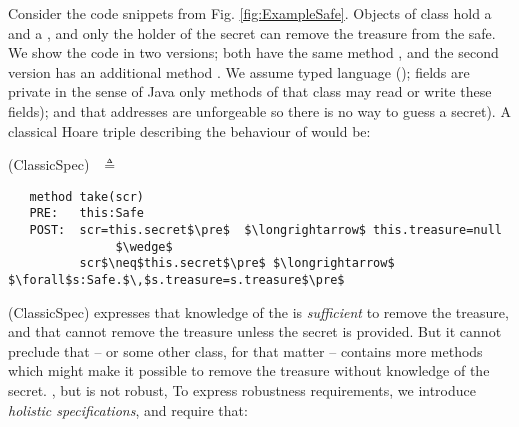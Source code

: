 Consider the code snippets from Fig. \ref{fig:ExampleSafe}. Objects of
 class   hold a  and a , and  only
 the holder of the secret can remove the treasure from the safe.
%
 We show the code in two versions; both   have the same method , and the second version 
 has an additional method .
  We 
 assume  typed language (); 
 fields are private in the sense of Java \sophia{(}\ie only
 methods of that class may read or write these fields);
 and that addresses are unforgeable \sophia{(}so  there is no way to guess a secret). 
 A classical Hoare triple describing the behaviour of  would be:
 
  \vspace{.1in}
  
(ClassicSpec)$  \ \ $  $\triangleq$
\vspace{-.1in}
\begin{lstlisting}
   method take(scr)
   PRE:   this:Safe  
   POST:  scr=this.secret$\pre$  $\longrightarrow$ this.treasure=null 
               $\wedge$
          scr$\neq$this.secret$\pre$ $\longrightarrow$  $\forall$s:Safe.$\,$s.treasure=s.treasure$\pre$
 \end{lstlisting}
\vspace{-.2in}

(ClassicSpec)  expresses  that knowledge of the  is  \emph{sufficient} %
to remove the treasure, and that  %
%
  cannot remove the treasure unless the secret is
provided. 
%
But it cannot preclude that  -- or some other class, for that matter -- contains more methods 
which might make it possible to remove the treasure  without knowledge of the
secret.
, but is 
not robust, 
To express robustness requirements, we introduce \emph{holistic specifications}, and require that:
 
